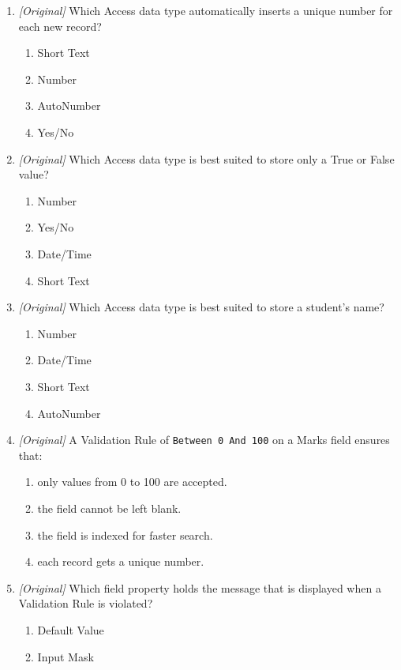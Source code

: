 \begin{enumerate}[label=\textbf{Q\arabic*.}, leftmargin=*]
\begin{enumerate}[label=\Alph*.]
    \item Data type
  \end{enumerate}
\item \textit{[Original]} Which Access data type automatically inserts a
  unique number for each new record?
  \begin{enumerate}[label=\Alph*.]
    \item Short Text
    \item Number
    \item AutoNumber
    \item Yes/No
  \end{enumerate}
\item \textit{[Original]} Which Access data type is best suited to store only
  a True or False value?
  \begin{enumerate}[label=\Alph*.]
    \item Number
    \item Yes/No
    \item Date/Time
    \item Short Text
  \end{enumerate}
\item \textit{[Original]} Which Access data type is best suited to store a
  student's name?
  \begin{enumerate}[label=\Alph*.]
    \item Number
    \item Date/Time
    \item Short Text
    \item AutoNumber
  \end{enumerate}
\item \textit{[Original]} A Validation Rule of \texttt{Between 0 And 100} on a
  Marks field ensures that:
  \begin{enumerate}[label=\Alph*.]
    \item only values from 0 to 100 are accepted.
    \item the field cannot be left blank.
    \item the field is indexed for faster search.
    \item each record gets a unique number.
  \end{enumerate}
\item \textit{[Original]} Which field property holds the message that is
  displayed when a Validation Rule is violated?
  \begin{enumerate}[label=\Alph*.]
    \item Default Value
    \item Input Mask

\end{enumerate}
\end{enumerate}
